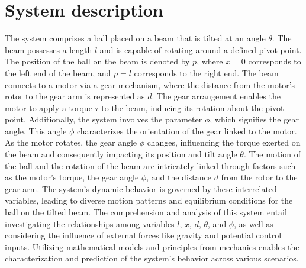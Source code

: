 \documentclass{article}
\begin{document}
\section{System description}
The system comprises a ball placed on a beam that is tilted at an angle $\theta$.
The beam possesses a length $l$ and is capable of rotating around a defined pivot point.
The position of the ball on the beam is denoted by $p$, where $x = 0$ corresponds to the left end of the beam,
and $p = l$ corresponds to the right end.
The beam connects to a motor via a gear mechanism, where the distance from the motor's rotor to the gear arm is represented as $d$. The gear arrangement enables the motor to apply a torque $\tau$ to the beam, inducing its rotation about the pivot point.
Additionally, the system involves the parameter $\phi$, which signifies the gear angle.
This angle $\phi$ characterizes the orientation of the gear linked to the motor. As the motor rotates,
the gear angle $\phi$ changes, influencing the torque exerted on the beam and consequently impacting its position and tilt angle $\theta$.
The motion of the ball and the rotation of the beam are intricately linked through factors such as the motor's torque,
the gear angle $\phi$, and the distance $d$ from the rotor to the gear arm.
The system's dynamic behavior is governed by these interrelated variables,
leading to diverse motion patterns and equilibrium conditions for the ball on the tilted beam.
The comprehension and analysis of this system entail investigating the relationships among variables $l$, $x$, $d$, $\theta$, and $\phi$, as well as considering the influence of external forces like gravity and potential control inputs.
Utilizing mathematical models and principles from mechanics enables the characterization and prediction of the system's behavior across various scenarios.
\end{document}
